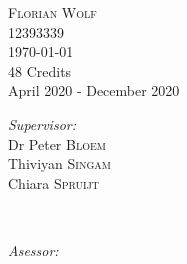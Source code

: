 \documentclass{article}
\begin{document}
\begin{titlepage}
\textsc{\Large Florian Wolf}\\[0.2cm] %

{12393339}\\[1cm]










{\Large \today}\\[1cm] %



{48 Credits}\\ %
{April 2020 - December 2020}\\[1cm]






\begin{minipage}[t]{0.4\textwidth}

\begin{flushleft} \large

\emph{Supervisor:} \\

Dr Peter \textsc{Bloem} \\ Thiviyan \textsc{Singam} \\ Chiara \textsc{Spruijt} %

\end{flushleft}

\end{minipage}

~

\begin{minipage}[t]{0.4\textwidth}

\begin{flushright} \large

\emph{Asessor:} \\


\end{flushright}
\end{minipage}
\end{titlepage}
\end{document}
